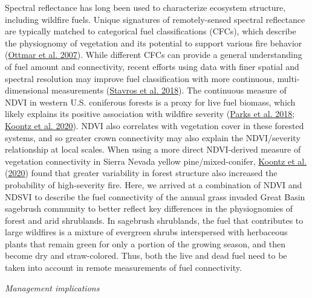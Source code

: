 \documentclass[
  12pt,
]{article}
\begin{document}
Spectral reflectance has long been used to characterize ecosystem
structure, including wildfire fuels. Unique signatures of
remotely-sensed spectral reflectance are typically matched to
categorical fuel classifications (CFCs), which describe the physiognomy
of vegetation and its potential to support various fire behavior
(\protect\hyperlink{ref-Ottmar2007}{Ottmar et al. 2007}). While
different CFCs can provide a general understanding of fuel amount and
connectivity, recent efforts using data with finer spatial and spectral
resolution may improve fuel classification with more continuous,
multi-dimensional measurements
(\protect\hyperlink{ref-Stavros2018}{Stavros et al. 2018}). The
continuous measure of NDVI in western U.S. coniferous forests is a proxy
for live fuel biomass, which likely explains its positive association
with wildfire severity (\protect\hyperlink{ref-Parks2018}{Parks et al.
2018}; \protect\hyperlink{ref-Koontz2020}{Koontz et al. 2020}). NDVI
also correlates with vegetation cover in these forested systems, and so
greater crown connectivity may also explain the NDVI/severity
relationship at local scales. When using a more direct NDVI-derived
measure of vegetation connectivity in Sierra Nevada yellow
pine/mixed-conifer, \protect\hyperlink{ref-Koontz2020}{Koontz et al.}
(\protect\hyperlink{ref-Koontz2020}{2020}) found that greater
variability in forest structure also increased the probability of
high-severity fire. Here, we arrived at a combination of NDVI and NDSVI
to describe the fuel connectivity of the annual grass invaded Great
Basin sagebrush community to better reflect key differences in the
physiognomies of forest and arid shrublands. In sagebrush shrublands,
the fuel that contributes to large wildfires is a mixture of evergreen
shrubs interspersed with herbaceous plants that remain green for only a
portion of the growing season, and then become dry and straw-colored.
Thus, both the live and dead fuel need to be taken into account in
remote measurements of fuel connectivity.

\emph{Management implications}
\end{document}
